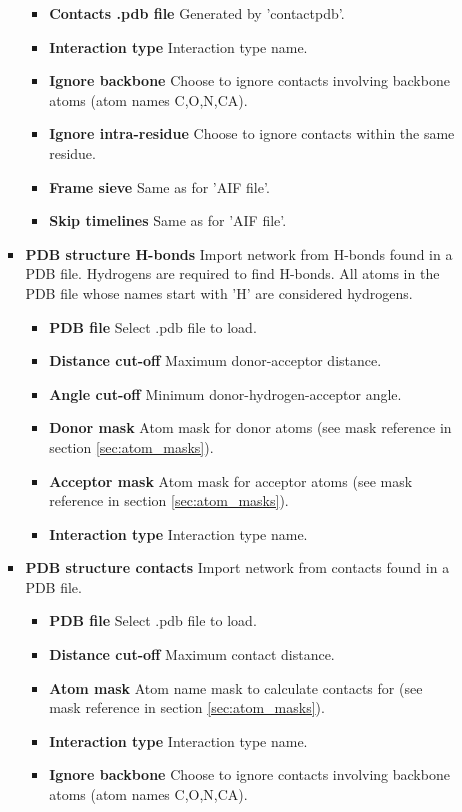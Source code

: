 \begin{itemize}
\begin{itemize}
\begin{itemize}
\begin{itemize}
    \item \textbf{Contacts .pdb file} Generated by 'contactpdb'.
    \item \textbf{Interaction type} Interaction type name.
    \item \textbf{Ignore backbone} Choose to ignore contacts involving backbone atoms (atom names C,O,N,CA).
    \item \textbf{Ignore intra-residue} Choose to ignore contacts within the same residue. 
    \item \textbf{Frame sieve} Same as for 'AIF file'.
    \item \textbf{Skip timelines} Same as for 'AIF file'.
    \end{itemize}
  \item \textbf{PDB structure H-bonds} Import network from H-bonds found in a PDB file. Hydrogens are required to find H-bonds. All atoms in the PDB file whose names start with 'H' are considered hydrogens.
    \begin{itemize}
    \item \textbf{PDB file} Select .pdb file to load.
    \item \textbf{Distance cut-off} Maximum donor-acceptor distance.
    \item \textbf{Angle cut-off} Minimum donor-hydrogen-acceptor angle.
    \item \textbf{Donor mask} Atom mask for donor atoms (see mask reference in section \ref{sec:atom_masks}).
    \item \textbf{Acceptor mask} Atom mask for acceptor atoms (see mask reference in section \ref{sec:atom_masks}).
    \item \textbf{Interaction type} Interaction type name.
    \end{itemize}
  \item \textbf{PDB structure contacts} Import network from contacts found in a PDB file.
    \begin{itemize}
    \item \textbf{PDB file} Select .pdb file to load.
    \item \textbf{Distance cut-off} Maximum contact distance.
    \item \textbf{Atom mask} Atom name mask to calculate contacts for (see mask reference in section \ref{sec:atom_masks}).
    \item \textbf{Interaction type} Interaction type name.
    \item \textbf{Ignore backbone} Choose to ignore contacts involving backbone atoms (atom names C,O,N,CA).

\end{itemize}
\end{itemize}
\end{itemize}
\end{itemize}
